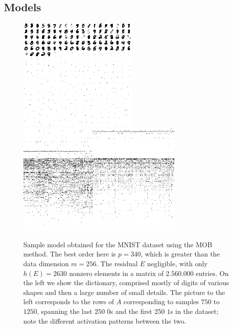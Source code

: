 \documentclass[twocolumn]{IEEEtran}
\theoremstyle{definition}
\begin{document}
\subsection{Models}

\begin{figure}[tp]
\centering\includegraphics[height=2.2in]{fig/mnist_mob_dict.png}\hspace{2ex}%
\includegraphics[height=2.2in]{fig/mnist_mob_coef_crop.png}%
\caption{\label{fig:mnist-mob} Sample model obtained for the MNIST dataset using the MOB method. The best order here is $p=340$, which is greater than the data dimension $m=256$. The residual $E$ negligible, with only $h(E)=2630$ nonzero elements in a matrix of $2.560.000$ entries. On the left we show the dictionary, comprised mostly of digits of various shapes and then a large number of small details. The picture to the left corresponds to the rows of $A$ corresponding to samples $750$ to $1250$, spanning the last $250$ $0$s and the first 250 $1$s in the dataset; note the different activation patterns between the two.}
\end{figure}
%
\end{document}
